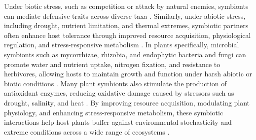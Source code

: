 \documentclass[12pt]{article}\usepackage[]{graphicx}\usepackage[dvipsnames]{xcolor}
\begin{document}
Under biotic stress, such as competition or attack by natural enemies, symbionts can mediate defensive traits across diverse taxa \citep{atala2022fungal,bastias2017epichloe,vega2008insect,haine2008symbiont,florez2015defensive}.
Similarly, under abiotic stress, including drought, nutrient limitation, and thermal extremes, symbiotic partners often enhance host tolerance through improved resource acquisition, physiological regulation, and stress-responsive metabolism \citep{clay2002evolutionary, afkhami2008symbiosis,cesar2024defensive}. 
In plants specifically, microbial symbionts such as mycorrhizae, rhizobia, and endophytic bacteria and fungi can promote water and nutrient uptake, nitrogen fixation, and resistance to herbivores, allowing hosts to maintain growth and function under harsh abiotic or biotic conditions \citep{amijee1989development, friesen2011microbially,van2015mycorrhizal}.
Many plant symbionts also stimulate the production of antioxidant enzymes, reducing oxidative damage caused by stressors such as drought, salinity, and heat \citep{ruiz1996superoxide}. 
By improving resource acquisition, modulating plant physiology, and enhancing stress-responsive metabolism, these symbiotic interactions help host plants buffer against environmental stochasticity and extreme conditions across a wide range of ecosystems \citep{fowler2023geographic,rudgers2020climate,li2026climate}.
\end{document}
